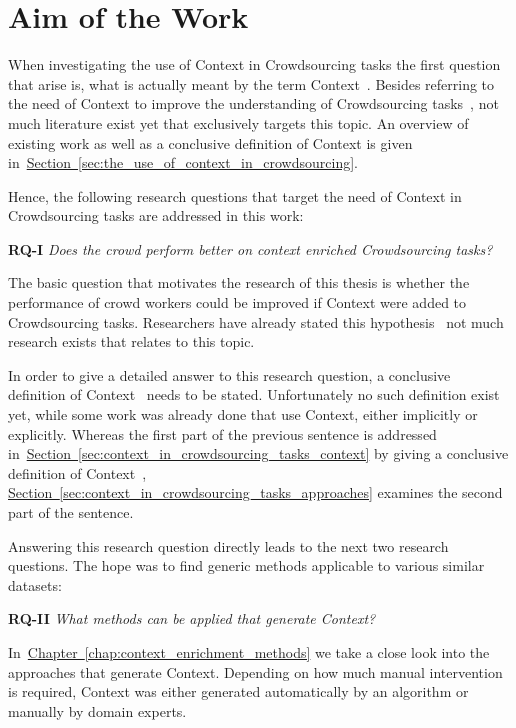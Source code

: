 \section{Aim of the Work}
When investigating the use of Context in Crowdsourcing tasks the first question that arise is, what is actually
meant by the term \guillemotright Context\guillemotleft~. Besides referring to the need of Context to improve the understanding
of Crowdsourcing tasks~\cite{sarasua2015crowdsourcing}, not much literature exist yet that exclusively targets this topic. An overview
of existing work as well as a conclusive definition of Context is given in~\hyperref[sec:the_use_of_context_in_crowdsourcing]{Section~\ref*{sec:the_use_of_context_in_crowdsourcing}}.

Hence, the following research questions that target the need of Context in Crowdsourcing tasks are addressed in this work:

\textbf{RQ-I} \emph{Does the crowd perform better on context enriched Crowdsourcing tasks?}

The basic question that motivates the research of this thesis is whether the performance of crowd workers could be improved if Context were added
to Crowdsourcing tasks. Researchers have already stated this hypothesis~\cite{sarasua2015crowdsourcing} not much research exists that relates to this topic. 

In order to give a detailed answer to this research question, a conclusive definition of \guillemotright Context\guillemotleft~ needs to be stated. Unfortunately no such definition exist yet, while some work was already done that use Context, either implicitly or explicitly. Whereas the first part of the previous sentence is addressed in~\hyperref[sec:context_in_crowdsourcing_tasks_context]{Section~\ref*{sec:context_in_crowdsourcing_tasks_context}} by giving a conclusive definition of \guillemotright Context\guillemotleft~, \hyperref[sec:context_in_crowdsourcing_tasks_approaches]{Section~\ref*{sec:context_in_crowdsourcing_tasks_approaches}} examines the second part of the sentence. 

Answering this research question directly leads to the next two research questions. The hope was to find generic methods applicable to various similar
datasets:

\textbf{RQ-II} \emph{What methods can be applied that generate Context?}

In~\hyperref[chap:context_enrichment_methods]{Chapter~\ref*{chap:context_enrichment_methods}} we take a close look into the approaches that generate Context. Depending on how much manual intervention is required, Context was either generated automatically by an algorithm or manually by domain experts. 

